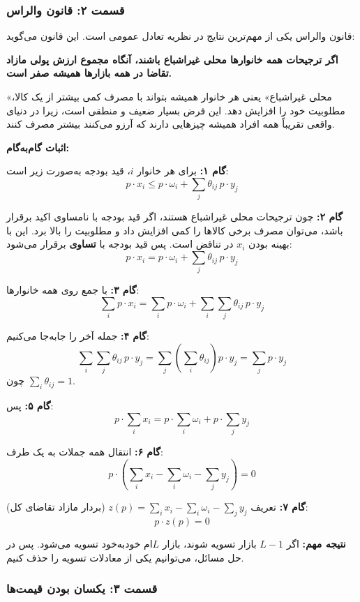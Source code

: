\documentclass[12pt,a4paper]{article}
\begin{document}
\subsubsection{قسمت ۲: قانون والراس}

قانون والراس یکی از مهم‌ترین نتایج در نظریه تعادل عمومی است. این قانون می‌گوید:

\textbf{اگر ترجیحات همه خانوارها محلی غیراشباع باشند، آنگاه مجموع ارزش پولی مازاد تقاضا در همه بازارها همیشه صفر است.}

«محلی غیراشباع» یعنی هر خانوار همیشه بتواند با مصرف کمی بیشتر از یک کالا، مطلوبیت خود را افزایش دهد. این فرض بسیار ضعیف و منطقی است، زیرا در دنیای واقعی تقریباً همه افراد همیشه چیزهایی دارند که آرزو می‌کنند بیشتر مصرف کنند.

\textbf{اثبات گام‌به‌گام:}

\textbf{گام ۱:} برای هر خانوار $i$، قید بودجه به‌صورت زیر است:
\[
	p \cdot x_i \leq p \cdot \omega_i + \sum_{j} \theta_{ij} \, p \cdot y_j
\]

\textbf{گام ۲:} چون ترجیحات محلی غیراشباع هستند، اگر قید بودجه با نامساوی اکید برقرار باشد، می‌توان مصرف برخی کالاها را کمی افزایش داد و مطلوبیت را بالا برد. این با بهینه بودن $x_i$ در تناقض است. پس قید بودجه با \textbf{تساوی} برقرار می‌شود:
\[
	p \cdot x_i = p \cdot \omega_i + \sum_{j} \theta_{ij} \, p \cdot y_j
\]

\textbf{گام ۳:} با جمع روی همه خانوارها:
\[
	\sum_{i} p \cdot x_i = \sum_{i} p \cdot \omega_i + \sum_{i} \sum_{j} \theta_{ij} \, p \cdot y_j
\]

\textbf{گام ۴:} جمله آخر را جابه‌جا می‌کنیم:
\[
	\sum_{i} \sum_{j} \theta_{ij} \, p \cdot y_j = \sum_{j} \left( \sum_{i} \theta_{ij} \right) p \cdot y_j = \sum_{j} p \cdot y_j
\]
چون $\sum_i \theta_{ij} = 1$.

\textbf{گام ۵:} پس:
\[
	p \cdot \sum_{i} x_i = p \cdot \sum_{i} \omega_i + p \cdot \sum_{j} y_j
\]

\textbf{گام ۶:} انتقال همه جملات به یک طرف:
\[
	p \cdot \left( \sum_{i} x_i - \sum_{i} \omega_i - \sum_{j} y_j \right) = 0
\]

\textbf{گام ۷:} تعریف $z(p) = \sum_i x_i - \sum_i \omega_i - \sum_j y_j$ (بردار مازاد تقاضای کل):
\[
	\boxed{p \cdot z(p) = 0}
\]

\textbf{نتیجه مهم:} اگر $L-1$ بازار تسویه شوند، بازار $L$ام خودبه‌خود تسویه می‌شود. پس در حل مسائل، می‌توانیم یکی از معادلات تسویه را حذف کنیم.

\subsubsection{قسمت ۳: یکسان بودن قیمت‌ها}
\end{document}
